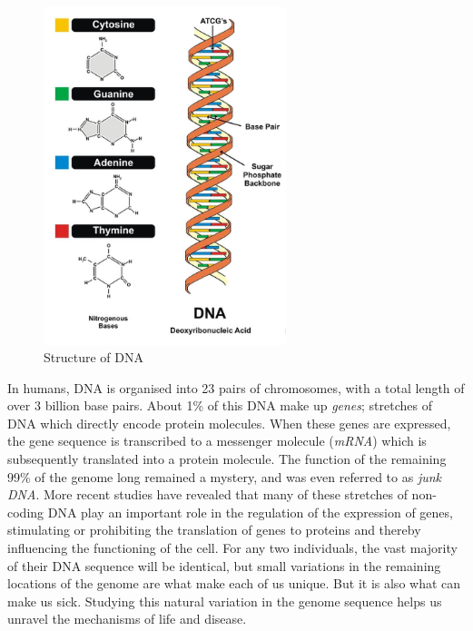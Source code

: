 \begin{figure}
    \centering
    \includegraphics[width=200pt]{chapters/images/introduction/dna-structure.png}
    \caption{Structure of DNA}\label{fig:dnastructure}
\end{figure}

In humans, DNA is organised into 23 pairs of chromosomes, with a total length of over 3 billion base pairs. About 1\% of this DNA make up \emph{genes}; stretches of DNA which directly encode protein molecules. When these genes are expressed, the gene sequence is transcribed to a messenger molecule (\emph{mRNA}) which is subsequently translated into a protein molecule. The function of the remaining 99\% of the genome long remained a mystery, and was even referred to as \emph{junk DNA}. More recent studies have revealed that many of these stretches of non-coding DNA play an important role in the regulation of the expression of genes, stimulating or prohibiting the translation of genes to proteins and thereby influencing the functioning of the cell. For any two individuals, the vast majority of their DNA sequence will be identical, but small variations in the remaining locations of the genome are what make each of us unique. But it is also what can make us sick. Studying this natural variation in the genome sequence helps us unravel the mechanisms of life and disease.

